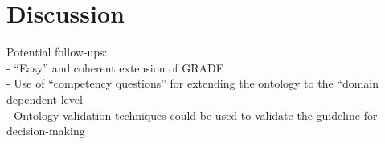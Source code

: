 \section{Discussion}
\label{sec-discussion}
Potential follow-ups:\\
- “Easy” and coherent extension of GRADE\\
- Use of “competency questions” for extending the ontology to the “domain dependent level\\
- Ontology validation techniques could be used to validate the guideline for decision-making
